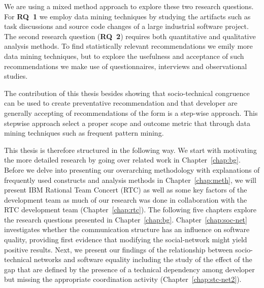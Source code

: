 We are using a mixed method approach to explore these two research questions.
For \textbf{RQ~1} we employ data mining techniques by studying the artifacts such as task discussions and source code changes of a large industrial software project.
The second research question (\textbf{RQ~2}) requires both quantitative and qualitative analysis methods.
To find statistically relevant recommendations we emily more data mining techniques, but to explore the usefulness and acceptance of such recommendations we make use of questionnaires, interviews and observational studies.

The contribution of this thesis besides showing that socio-technical congruence can be used to create preventative recommendation and that developer are generally accepting of recommendations of the form is a step-wise approach.
This stepwise approach select a proper scope and outcome metric that through data mining techniques such as frequent pattern mining.

This thesis is therefore structured in the following way.
We start with motivating the more detailed research by going over related work in Chapter~\ref{chap:bg}.
Before we delve into presenting our overarching methodology with explanations of frequently used constructs and analysis methods in Chapter~\ref{chap:meth}, we will present IBM Rational Team Concert (RTC) as well as some key factors of the development team as much of our research was done in collaboration with the RTC development team (Chapter~\ref{chap:rtc}).
The following five chapters explore the research questions presented in Chapter~\ref{chap:bg}.
Chapter~\ref{chap:soc-net} investigates whether the communication structure has an influence on software quality, providing first evidence that modifying the social-network might yield positive results.
Next, we present our findings of the relationship between socio-technical networks and software equality including the study of the effect of the gap that are defined by the presence of a technical dependency among developer but missing the appropriate coordination activity (Chapter~\ref{chap:stc-net2}).


